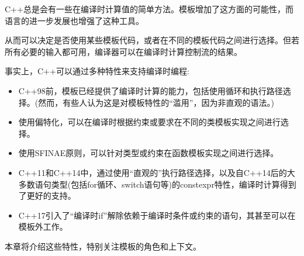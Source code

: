 C++总是会有一些在编译时计算值的简单方法。模板增加了这方面的可能性，而语言的进一步发展也增强了这种工具。

从而可以决定是否使用某些模板代码，或者在不同的模板代码之间进行选择。但若所有必要的输入都可用，编译器可以在编译时计算控制流的结果。

事实上，C++可以通过多种特性来支持编译时编程:

\begin{itemize}
\item 
C++98前，模板已经提供了编译时计算的能力，包括使用循环和执行路径选择。(然而，有些人认为这是对模板特性的“滥用”，因为非直观的语法。)

\item 
使用偏特化，可以在编译时根据约束或要求在不同的类模板实现之间进行选择。

\item 
使用SFINAE原则，可以针对类型或约束在函数模板实现之间进行选择。

\item 
C++11和C++14中，通过使用“直观的”执行路径选择，以及自C++14后的大多数语句类型(包括for循环、switch语句等)的constexpr特性，编译时计算得到了更好的支持。

\item 
C++17引入了“编译时if”解除依赖于编译时条件或约束的语句，其甚至可以在模板外工作。
\end{itemize}

本章将介绍这些特性，特别关注模板的角色和上下文。


